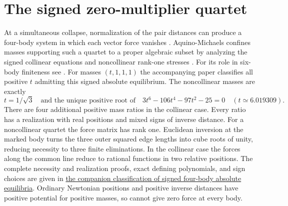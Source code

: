 \documentclass[11pt]{article}
\begin{document}
\appendix
\section{The signed zero-multiplier quartet}
At a simultaneous collapse, normalization of the pair distances can produce a four-body system in which each vector force vanishes \cite[\S5.5]{AK}. Aquino-Michaels confines masses supporting such a quartet to a proper algebraic subset by analyzing the signed collinear equations and noncollinear rank-one stresses \cite[Lemmas~5.3--5.5, Thm.~5.6]{Residual}. For its role in six-body finiteness see \cite[\S7.2]{Tomar}. For masses $(t,1,1,1)$ the accompanying paper classifies all positive $t$ admitting this signed absolute equilibrium. The noncollinear masses are exactly
\[
 t=1/\sqrt3\quad\text{and the unique positive root of}\quad
 3t^6-106t^4-97t^2-25=0\quad (t\simeq6.019309).
\]
There are four additional positive mass ratios in the collinear case. Every ratio has a realization with real positions and mixed signs of inverse distance. For a noncollinear quartet the force matrix has rank one. Euclidean inversion at the marked body turns the three outer squared edge lengths into cube roots of unity, reducing necessity to three finite eliminations. In the collinear case the forces along the common line reduce to rational functions in two relative positions. The complete necessity and realization proofs, exact defining polynomials, and sign choices are given in
\href{https://github.com/rongyulin/physics-open-problems-AI/blob/main/problems/planar-central-configurations/papers/SignedQuartetEquilibria.pdf}{the companion classification of signed four-body absolute equilibria}. Ordinary Newtonian positions and positive inverse distances have positive potential for positive masses, so cannot give zero force at every body.
\end{document}
